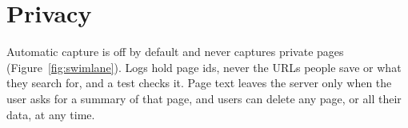 \section{Privacy}

Automatic capture is off by default and never captures private pages
(Figure~\ref{fig:swimlane}). Logs hold page ids, never the URLs people save
or what they search for, and a test checks it. Page text leaves the server
only when the user asks for a summary of that page, and users can delete any
page, or all their data, at any time.
